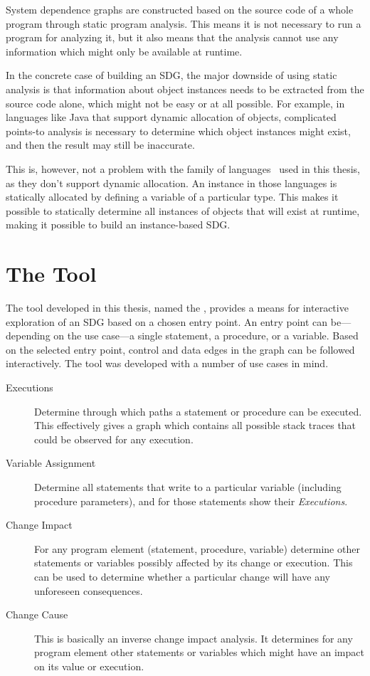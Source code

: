 System dependence graphs are constructed based on the source code of a whole program through static program analysis. 
This means it is not necessary to run a program for analyzing it, but it also means that the analysis cannot use any 
information which might only be available at runtime.

In the concrete case of building an SDG, the major downside of using static analysis is that information about object 
instances needs to be extracted from the source code alone, which might not be easy or at all possible. For example, in 
languages like Java that support dynamic allocation of objects, complicated points-to analysis is necessary to 
determine which object instances might exist, and then the result may still be inaccurate.

This is, however, not a problem with the \IEC family of languages~\cite{IEC61131:2003} used in this thesis, as they 
don't support dynamic allocation. An instance in those languages is statically allocated by defining a variable of a 
particular type. This makes it possible to statically determine all instances of objects that will exist at runtime, 
making it possible to build an instance-based SDG.


\section{The Tool} \label{sec:intro-tool}

The tool developed in this thesis, named the \emph{\SB}, provides a means for interactive exploration of an SDG based 
on a chosen entry point. An entry point can be---depending on the use case---a single statement, a procedure, or a 
variable. Based on the selected entry point, control and data edges in the graph can be followed interactively. The 
tool was developed with a number of use cases in mind.

\begin{description}
  \item[Executions] Determine through which paths a statement or procedure can be executed. This effectively gives a 
  graph which contains all possible stack traces that could be observed for any execution.
  
  \item[Variable Assignment] Determine all statements that write to a particular variable (including procedure 
  parameters), and for those statements show their \emph{Executions}.
  
  \item[Change Impact] For any program element (statement, procedure, variable) determine other statements or variables 
  possibly affected by its change or execution. This can be used to determine whether a particular change will have any 
  unforeseen consequences.
  
  \item[Change Cause] This is basically an inverse change impact analysis. It determines for any program element
  other statements or variables which might have an impact on its value or execution.
\end{description}

